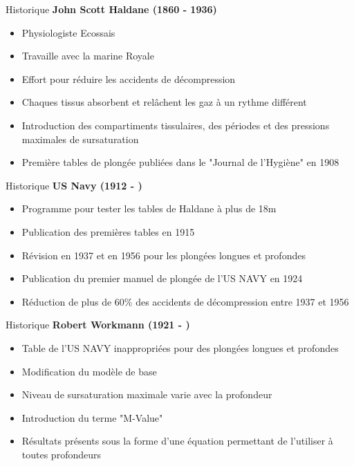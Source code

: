 \begin{frame}{Historique}  
	\textbf{John Scott Haldane (1860 - 1936)}
	\begin{itemize}
		\item Physiologiste Ecossais
		\item Travaille avec la marine Royale
		\item Effort pour réduire les accidents de décompression
		\item Chaques tissus absorbent et relâchent les gaz à un rythme différent
		\item Introduction des compartiments tissulaires, des périodes et des pressions maximales de sursaturation
		\item Première tables de plongée publiées dans le "Journal de l'Hygiène" en 1908
	\end{itemize}
\end{frame}

\begin{frame}{Historique}
	\textbf{US Navy (1912 - )}
	\begin{itemize}
		\item Programme pour tester les tables de Haldane à plus de 18m
		\item Publication des premières tables en 1915
		\item Révision en 1937 et en 1956 pour les plongées longues et profondes
		\item Publication du premier manuel de plongée de l'US NAVY en 1924
		\item Réduction de plus de 60\% des accidents de décompression entre 1937 et 1956
	\end{itemize}
\end{frame}

\begin{frame}{Historique}  
	\textbf{Robert Workmann (1921 - )}
	\begin{itemize}
		\item Table de l'US NAVY inappropriées pour des plongées longues et profondes
		\item Modification du modèle de base
		\item Niveau de sursaturation maximale varie avec la profondeur
		\item Introduction du terme "M-Value"
		\item Résultats présents sous la forme d'une équation permettant de l'utiliser à toutes profondeurs
	\end{itemize}
\end{frame}


